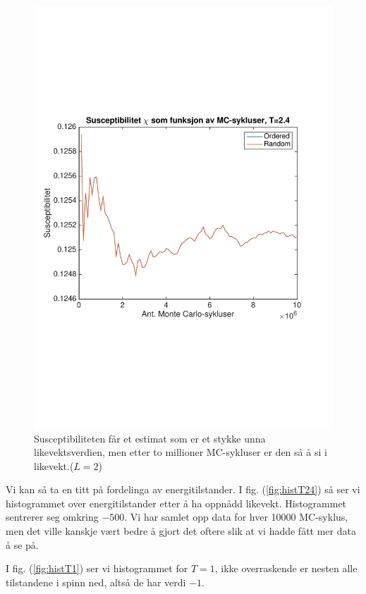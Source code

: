 \documentclass[norsk, 10pt]{article}
\begin{document}
\begin{figure}[H]
\centering
\includegraphics[scale = 0.5, trim = 1cm 8cm 1cm 8cm]{b_chi_MC_L2_T24.pdf}
\caption{Susceptibiliteten får et estimat som er et stykke unna likevektsverdien, men etter to millioner MC-sykluser er den så å si i likevekt.($L=2$)}
\label{fig:chiT24}
\end{figure}

Vi kan så ta en titt på fordelinga av energitilstander. I fig. (\ref{fig:histT24}) så ser vi histogrammet over energitilstander etter å ha oppnådd likevekt. Histogrammet sentrerer seg omkring $-500$. Vi har samlet opp data for hver 10000 MC-syklus, men det ville kanskje vært bedre å gjort det oftere slik at vi hadde fått mer data å se på.

I fig. (\ref{fig:histT1}) ser vi histogrammet for $T=1$, ikke overraskende er nesten alle tilstandene i spinn ned, altså de har verdi $-1$.
\end{document}
